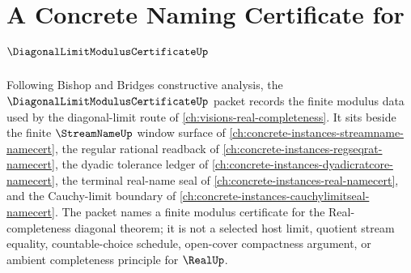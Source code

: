 \chapter{A Concrete Naming Certificate for $\DiagonalLimitModulusCertificateUp$}
\label{ch:concrete-instances-diagonal-limit-modulus-certificate-namecert}

Following Bishop and Bridges constructive analysis, the $\DiagonalLimitModulusCertificateUp$ packet records the finite modulus data used by the diagonal-limit route of \autoref{ch:visions-real-completeness}. It sits beside the finite $\StreamNameUp$ window surface of \autoref{ch:concrete-instances-streamname-namecert}, the regular rational readback of \autoref{ch:concrete-instances-regseqrat-namecert}, the dyadic tolerance ledger of \autoref{ch:concrete-instances-dyadicratcore-namecert}, the terminal real-name seal of \autoref{ch:concrete-instances-real-namecert}, and the Cauchy-limit boundary of \autoref{ch:concrete-instances-cauchylimitseal-namecert}. The packet names a finite modulus certificate for the Real-completeness diagonal theorem; it is not a selected host limit, quotient stream equality, countable-choice schedule, open-cover compactness argument, or ambient completeness principle for $\RealUp$.


